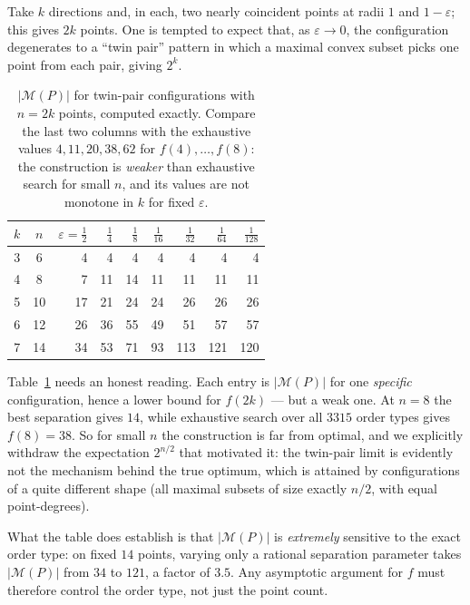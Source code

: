 \documentclass[11pt,a4paper]{article}
\theoremstyle{definition}
\newcommand{\M}{\mathcal{M}}
\begin{document}
Take $k$ directions and, in each, two nearly coincident points at radii $1$ and
$1-\varepsilon$; this gives $2k$ points.  One is tempted to expect that, as
$\varepsilon\to 0$, the configuration degenerates to a ``twin pair'' pattern in
which a maximal convex subset picks one point from each pair, giving $2^k$.

\begin{table}[ht]
\centering
\caption{$|\M(P)|$ for twin-pair configurations with $n=2k$ points, computed
exactly.  Compare the last two columns with the exhaustive values
$4,11,20,38,62$ for $f(4),\dots,f(8)$: the construction is \emph{weaker} than
exhaustive search for small $n$, and its values are not monotone in $k$ for
fixed $\varepsilon$.}
\label{tab:twin}
\begin{tabular}{c c r r r r r r r}
\toprule
$k$ & $n$ & $\varepsilon=\frac12$ & $\frac14$ & $\frac18$ & $\frac1{16}$ &
$\frac1{32}$ & $\frac1{64}$ & $\frac1{128}$ \\
\midrule
3 & 6  & 4  & 4  & 4  & 4  & 4  & 4  & 4 \\
4 & 8  & 7  & 11 & 14 & 11 & 11 & 11 & 11 \\
5 & 10 & 17 & 21 & 24 & 24 & 26 & 26 & 26 \\
6 & 12 & 26 & 36 & 55 & 49 & 51 & 57 & 57 \\
7 & 14 & 34 & 53 & 71 & 93 & 113 & 121 & 120 \\
\bottomrule
\end{tabular}
\end{table}

Table~\ref{tab:twin} needs an honest reading.  Each entry is
$|\M(P)|$ for one \emph{specific} configuration, hence a lower bound for $f(2k)$
--- but a weak one.  At $n=8$ the best separation gives $14$, while exhaustive
search over all $3315$ order types gives $f(8)=38$.  So for small $n$ the
construction is far from optimal, and we explicitly withdraw the expectation
$2^{n/2}$ that motivated it: the twin-pair limit is evidently not the mechanism
behind the true optimum, which is attained by configurations of a quite different
shape (all maximal subsets of size exactly $n/2$, with equal point-degrees).

What the table does establish is that $|\M(P)|$ is \emph{extremely} sensitive to
the exact order type: on fixed $14$ points, varying only a rational separation
parameter takes $|\M(P)|$ from $34$ to $121$, a factor of $3.5$.  Any
asymptotic argument for $f$ must therefore control the order type, not just the
point count.
\end{document}
